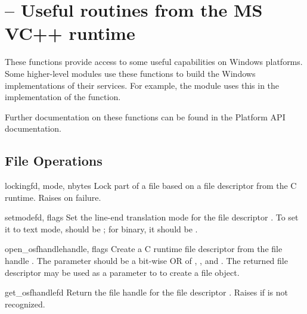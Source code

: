 \section{ --
         Useful routines from the MS VC++ runtime}



These functions provide access to some useful capabilities on Windows
platforms.  Some higher-level modules use these functions to build the 
Windows implementations of their services.  For example, the
 module uses this in the implementation of the
 function.

Further documentation on these functions can be found in the Platform
API documentation.


\subsection{File Operations \label{msvcrt-files}}

\begin{funcdesc}{locking}{fd, mode, nbytes}
  Lock part of a file based on a file descriptor from the C runtime.
  Raises  on failure.
\end{funcdesc}

\begin{funcdesc}{setmode}{fd, flags}
  Set the line-end translation mode for the file descriptor .
  To set it to text mode,  should be ;
  for binary, it should be .
\end{funcdesc}

\begin{funcdesc}{open_osfhandle}{handle, flags}
  Create a C runtime file descriptor from the file handle
  .  The  parameter should be a bit-wise OR of
  , , and .
  The returned file descriptor may be used as a parameter to
   to create a file object.
\end{funcdesc}

\begin{funcdesc}{get_osfhandle}{fd}
  Return the file handle for the file descriptor .  Raises
   if  is not recognized.
\end{funcdesc}


